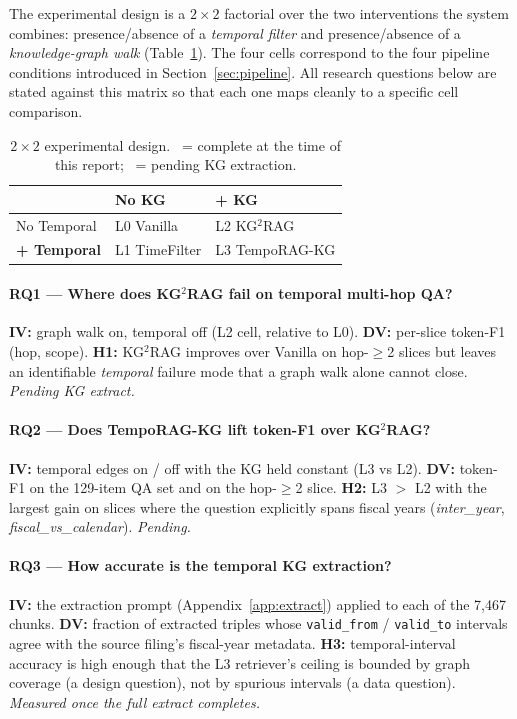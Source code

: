 \documentclass[11pt]{article}
\newcommand{\cmark}{\ding{51}}
\newcommand{\xmark}{\ding{55}}
\begin{document}
The experimental design is a $2\times2$ factorial over the two
interventions the system combines: presence/absence of a \emph{temporal
filter} and presence/absence of a \emph{knowledge-graph walk}
(Table~\ref{tab:2x2}). The four cells correspond to the four pipeline
conditions introduced in Section~\ref{sec:pipeline}. All research
questions below are stated against this matrix so that each one maps
cleanly to a specific cell comparison.

\begin{table}[h]
\centering
\small
\setlength{\tabcolsep}{4pt}
\begin{tabular}{@{}lll@{}}
\toprule
            & No KG                   & \textbf{+ KG}            \\
\midrule
No Temporal & L0 Vanilla \cmark       & L2 KG$^{2}$RAG \xmark    \\
\textbf{+ Temporal} & L1 TimeFilter \cmark & L3 TempoRAG-KG \xmark    \\
\bottomrule
\end{tabular}
\caption{$2\times2$ experimental design. \cmark\ = complete at the time
of this report; \xmark\ = pending KG extraction.}
\label{tab:2x2}
\end{table}

\paragraph{RQ1 --- Where does KG$^{2}$RAG fail on temporal multi-hop QA?}
\textbf{IV:} graph walk on, temporal off (L2 cell, relative to L0).
\textbf{DV:} per-slice token-F1 (hop, scope). \textbf{H1:} KG$^{2}$RAG
improves over Vanilla on hop-$\geq$2 slices but leaves an identifiable
\emph{temporal} failure mode that a graph walk alone cannot close.
\emph{Pending KG extract.}

\paragraph{RQ2 --- Does TempoRAG-KG lift token-F1 over KG$^{2}$RAG?}
\textbf{IV:} temporal edges on / off with the KG held constant
(L3 vs L2). \textbf{DV:} token-F1 on the 129-item QA set and on the
hop-$\geq$2 slice. \textbf{H2:} L3 $>$ L2 with the largest gain on
slices where the question explicitly spans fiscal years
(\textit{inter\_year}, \textit{fiscal\_vs\_calendar}). \emph{Pending.}

\paragraph{RQ3 --- How accurate is the temporal KG extraction?}
\textbf{IV:} the extraction prompt (Appendix~\ref{app:extract}) applied
to each of the 7{,}467 chunks. \textbf{DV:} fraction of extracted triples
whose \texttt{valid\_from} / \texttt{valid\_to} intervals agree with the
source filing's fiscal-year metadata. \textbf{H3:} temporal-interval
accuracy is high enough that the L3 retriever's ceiling is bounded by
graph coverage (a design question), not by spurious intervals (a data
question). \emph{Measured once the full extract completes.}
\end{document}
